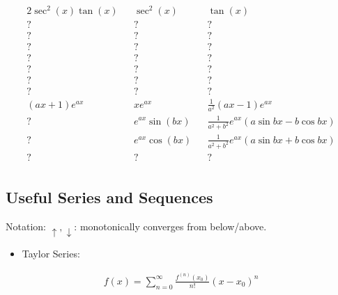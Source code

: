 \begin{align*}
2\sec^2(x)\tan(x)                        && \sec^2(x)                   && \tan(x) \\
?                                        && ?                           && ? \\
?                                        && ?                           && ? \\
?                                        && ?                           && ? \\
?                                        && ?                           && ? \\
?                                        && ?                           && ? \\
?                                        && ?                           && ? \\
?                                        && ?                           && ? \\
(ax+1)e^{ax}                             && xe^{ax}                     && \frac { 1 } { a ^ { 2 } } ( a x - 1 ) e ^ { a x } \\
?                                        && e^{ax}\sin(bx)              && \frac { 1 } { a ^ { 2 } + b ^ { 2 } } e ^ { a x } ( a \sin b x - b \cos b x ) \\
?                                        && e^{ax}\cos(bx)              && \frac { 1 } { a ^ { 2 } + b ^ { 2 } } e ^ { a x } ( a \sin b x + b \cos b x ) \\
?                                        && ?                           && ? \\
\end{align*}

\hypertarget{useful-series-and-sequences}{%
\subsection{Useful Series and
Sequences}\label{useful-series-and-sequences}}

Notation: \(\uparrow, \downarrow\): monotonically converges from
below/above.

\begin{itemize}
\tightlist
\item
  Taylor Series:
\end{itemize}

\begin{align*}
f ( x ) = \sum _ { n = 0 } ^ { \infty } \frac { f ^ { ( n ) } \left( x _ { 0 } \right) } { n ! } \left( x - x _ { 0 } \right) ^ { n }
\end{align*}


